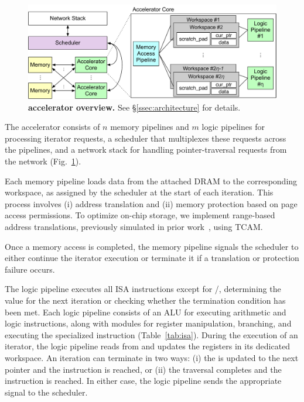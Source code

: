 \begin{figure}[t]
\centering
  \includegraphics[width=\columnwidth]{fig/pulse/accelerator.pdf}
  \vspace{-2em}
 \caption[\pulse accelerator overview]{\textbf{\pulse accelerator overview.} See \S\ref{ssec:architecture} for details.}
\label{fig:accelnew}
\end{figure}
 The \pulse accelerator consists of $n$ memory pipelines and $m$ logic pipelines for processing iterator requests, a scheduler that multiplexes these requests across the pipelines, and a network stack for handling pointer-traversal requests from the network (Fig.~\ref{fig:accelnew}).

 Each memory pipeline loads data from the attached DRAM to the corresponding workspace, as assigned by the scheduler at the start of each iteration. This process involves (i) address translation and (ii) memory protection based on page access permissions. To optimize on-chip storage, we implement range-based address translations, previously simulated in prior work~\cite{range}, using TCAM.

Once a memory access is completed, the memory pipeline signals the scheduler to either continue the iterator execution or terminate it if a translation or protection failure occurs.

 The logic pipeline executes all \pulse ISA instructions except for /, determining the  value for the next iteration or checking whether the termination condition has been met. Each logic pipeline consists of an ALU for executing arithmetic and logic instructions, along with modules for register manipulation, branching, and executing the specialized  instruction (Table~\ref{tab:isa}). During the execution of an iterator, the logic pipeline reads from and updates the registers in its dedicated workspace. An iteration can terminate in two ways: (i) the  is updated to the next pointer and the  instruction is reached, or (ii) the traversal completes and the  instruction is reached. In either case, the logic pipeline sends the appropriate signal to the scheduler.

